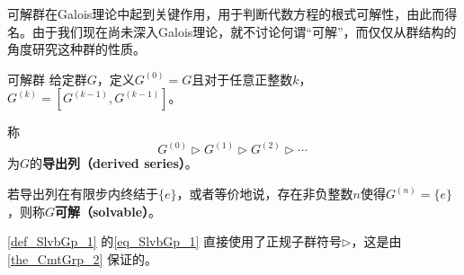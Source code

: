 



可解群在Galois理论中起到关键作用，用于判断代数方程的根式可解性，由此而得名。由于我们现在尚未深入Galois理论，就不讨论何谓“可解”，而仅仅从群结构的角度研究这种群的性质。


\begin{definition}{可解群}\label{def_SlvbGp_1}
给定群$G$，定义$G^{(0)}=G$且对于任意正整数$k$，$G^{(k)}=[G^{(k-1)}, G^{(k-1)}]$。

称
\begin{equation}\label{eq_SlvbGp_1}
G^{(0)}\rhd G^{(1)}\rhd G^{(2)}\rhd \cdots~
\end{equation}
为$G$的\textbf{导出列（derived series）}。

若导出列在有限步内终结于$\{e\}$，或者等价地说，存在非负整数$n$使得$G^{(n)}=\{e\}$，则称$G$\textbf{可解（solvable）}。

\end{definition}


\autoref{def_SlvbGp_1} 的\autoref{eq_SlvbGp_1} 直接使用了正规子群符号$\rhd$，这是由\autoref{the_CmtGrp_2} 保证的。





































